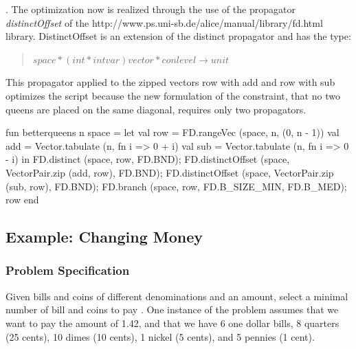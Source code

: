 \documentclass[a4paper]{scrartcl}
\begin{document}
.
The optimization now is realized through the use
of the propagator {\it distinctOffset} of the 
\htmladdnormallink{\textcolor{blue}{\it FD}}
{http://www.ps.uni-sb.de/alice/manual/library/fd.html}
library. DistinctOffset is an extension
of the distinct propagator and has the type:
\begin{quote}
$ space * (int * intvar) vector * conlevel \rightarrow  unit $
\end{quote}
 
This propagator applied to the zipped vectors row with add and row with sub optimizes
the script because the new formulation of the constraint, that no two
queens are placed on the same diagonal, requires only two propagators.
\begin{myverbatim}
fun betterqueens n space =
  let
    val row = FD.rangeVec (space, n, (0, n - 1))
    val add = Vector.tabulate (n, fn i => 0 + i)
    val sub = Vector.tabulate (n, fn i => 0 - i)
  in
    FD.distinct (space, row, FD.BND);
    FD.distinctOffset (space, VectorPair.zip (add, row), FD.BND);
    FD.distinctOffset (space, VectorPair.zip (sub, row), FD.BND);
    FD.branch (space, row, FD.B_SIZE_MIN, FD.B_MED);
    row
  end
\end{myverbatim}


\newpage
\subsection{Example: Changing Money}
\subsubsection{Problem Specification}
Given bills and coins of different denominations and an amount, 
select a minimal number of bill and coins to pay . One instance of the 
problem assumes that we want to pay the amount of 1.42, and that we have 
6 one dollar bills, 8 quarters (25 cents), 10 dimes (10 cents), 1 nickel 
(5 cents), and 5 pennies (1 cent). 
\end{document}
